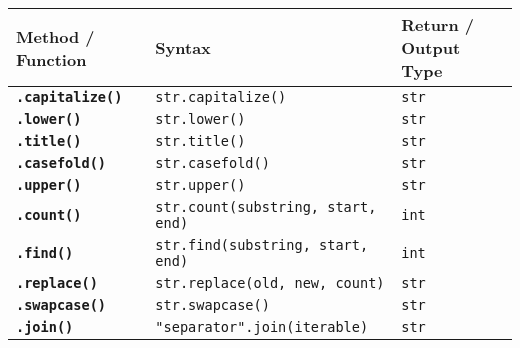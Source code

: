 \documentclass[a4paper,11pt]{article}
\begin{document}
	\begin{tabular}{>{\bfseries}p{3.5cm} p{8cm} p{3cm}}
		\toprule
		Method / Function & Syntax & Return / Output Type \\
		\midrule
		
		\texttt{.capitalize()} & \texttt{str.capitalize()} & \texttt{str} \\
		
		\texttt{.lower()} & \texttt{str.lower()} & \texttt{str} \\
		
		\texttt{.title()} & \texttt{str.title()} & \texttt{str} \\
		
		\texttt{.casefold()} & \texttt{str.casefold()} & \texttt{str} \\
		
		\texttt{.upper()} & \texttt{str.upper()} & \texttt{str} \\
		
		\texttt{.count()} & \texttt{str.count(substring, start, end)} & \texttt{int} \\
		
		\texttt{.find()} & \texttt{str.find(substring, start, end)} & \texttt{int} \\
		
		\texttt{.replace()} & \texttt{str.replace(old, new, count)} & \texttt{str} \\
		
		\texttt{.swapcase()} & \texttt{str.swapcase()} & \texttt{str} \\
		
		\texttt{.join()} & \texttt{"separator".join(iterable)} & \texttt{str} \\
		
		\bottomrule
	\end{tabular}
	

	
	
	
	
	
\end{document}
